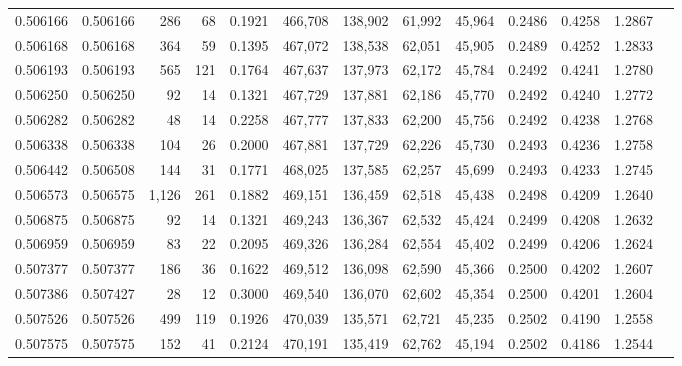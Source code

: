 \begin{tabular}{rrrrrrrrrrrrr}
0.506166 & 0.506166 &   286 &    68 &                                     0.1921 & 466,708 & 138,902 &  61,992 &  45,964 & 0.2486 & 0.4258 & 1.2867 \\
0.506168 & 0.506168 &   364 &    59 &                                     0.1395 & 467,072 & 138,538 &  62,051 &  45,905 & 0.2489 & 0.4252 & 1.2833 \\
0.506193 & 0.506193 &   565 &   121 &                                     0.1764 & 467,637 & 137,973 &  62,172 &  45,784 & 0.2492 & 0.4241 & 1.2780 \\
0.506250 & 0.506250 &    92 &    14 &                                     0.1321 & 467,729 & 137,881 &  62,186 &  45,770 & 0.2492 & 0.4240 & 1.2772 \\
0.506282 & 0.506282 &    48 &    14 &                                     0.2258 & 467,777 & 137,833 &  62,200 &  45,756 & 0.2492 & 0.4238 & 1.2768 \\
0.506338 & 0.506338 &   104 &    26 &                                     0.2000 & 467,881 & 137,729 &  62,226 &  45,730 & 0.2493 & 0.4236 & 1.2758 \\
0.506442 & 0.506508 &   144 &    31 &                                     0.1771 & 468,025 & 137,585 &  62,257 &  45,699 & 0.2493 & 0.4233 & 1.2745 \\
0.506573 & 0.506575 & 1,126 &   261 &                                     0.1882 & 469,151 & 136,459 &  62,518 &  45,438 & 0.2498 & 0.4209 & 1.2640 \\
0.506875 & 0.506875 &    92 &    14 &                                     0.1321 & 469,243 & 136,367 &  62,532 &  45,424 & 0.2499 & 0.4208 & 1.2632 \\
0.506959 & 0.506959 &    83 &    22 &                                     0.2095 & 469,326 & 136,284 &  62,554 &  45,402 & 0.2499 & 0.4206 & 1.2624 \\
0.507377 & 0.507377 &   186 &    36 &                                     0.1622 & 469,512 & 136,098 &  62,590 &  45,366 & 0.2500 & 0.4202 & 1.2607 \\
0.507386 & 0.507427 &    28 &    12 &                                     0.3000 & 469,540 & 136,070 &  62,602 &  45,354 & 0.2500 & 0.4201 & 1.2604 \\
0.507526 & 0.507526 &   499 &   119 &                                     0.1926 & 470,039 & 135,571 &  62,721 &  45,235 & 0.2502 & 0.4190 & 1.2558 \\
0.507575 & 0.507575 &   152 &    41 &                                     0.2124 & 470,191 & 135,419 &  62,762 &  45,194 & 0.2502 & 0.4186 & 1.2544 \\

\end{tabular}
